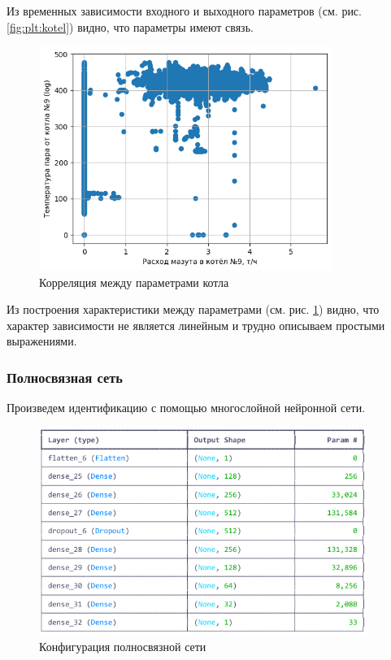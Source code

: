 Из временных зависимости входного и выходного параметров (см. рис.
\ref{fig:plt:kotel}) видно, что параметры имеют связь. 

\begin{figure}[H]
  \begin{center}
    \includegraphics[width=0.85\textwidth]{figures/plots/kotel_temp_mazut_rel.png}
  \end{center}
  \caption{Корреляция между параметрами котла}\label{fig:plt:kotel:rel}
\end{figure}

Из построения характеристики между параметрами (см. рис.
\ref{fig:plt:kotel:rel}) видно, что характер зависимости не является линейным и
трудно описываем простыми выражениями. 

\subsubsection{Полносвязная сеть}

Произведем идентификацию с помощью многослойной нейронной сети. 

\begin{figure}[H]
  \begin{center}
    \includegraphics[width=0.95\textwidth]{figures/tensorflow/dense.png}
  \end{center}
  \caption{Конфигурация полносвязной сети}\label{fig:tf:dense}
\end{figure}

